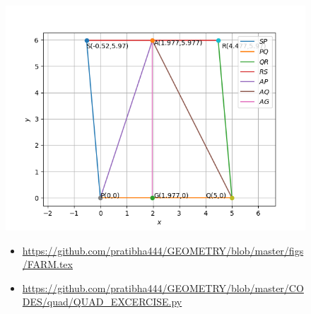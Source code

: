 \begin{frame}
\begin{figure}
\includegraphics[scale=.5]{./CODES/quad/QUAD_EX.png}\\
\begin{itemize}
\item \url{https://github.com/pratibha444/GEOMETRY/blob/master/figs/FARM.tex}\\
\item \url{https://github.com/pratibha444/GEOMETRY/blob/master/CODES/quad/QUAD_EXCERCISE.py}
\end{itemize}
\seti
\end{figure}
\end{frame}
